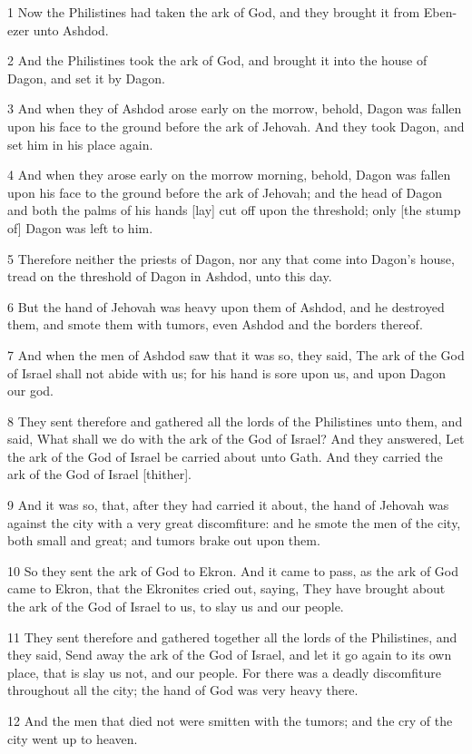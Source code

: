 \par 1 Now the Philistines had taken the ark of God, and they brought it from Eben-ezer unto Ashdod.
\par 2 And the Philistines took the ark of God, and brought it into the house of Dagon, and set it by Dagon.
\par 3 And when they of Ashdod arose early on the morrow, behold, Dagon was fallen upon his face to the ground before the ark of Jehovah. And they took Dagon, and set him in his place again.
\par 4 And when they arose early on the morrow morning, behold, Dagon was fallen upon his face to the ground before the ark of Jehovah; and the head of Dagon and both the palms of his hands [lay] cut off upon the threshold; only [the stump of] Dagon was left to him.
\par 5 Therefore neither the priests of Dagon, nor any that come into Dagon's house, tread on the threshold of Dagon in Ashdod, unto this day.
\par 6 But the hand of Jehovah was heavy upon them of Ashdod, and he destroyed them, and smote them with tumors, even Ashdod and the borders thereof.
\par 7 And when the men of Ashdod saw that it was so, they said, The ark of the God of Israel shall not abide with us; for his hand is sore upon us, and upon Dagon our god.
\par 8 They sent therefore and gathered all the lords of the Philistines unto them, and said, What shall we do with the ark of the God of Israel? And they answered, Let the ark of the God of Israel be carried about unto Gath. And they carried the ark of the God of Israel [thither].
\par 9 And it was so, that, after they had carried it about, the hand of Jehovah was against the city with a very great discomfiture: and he smote the men of the city, both small and great; and tumors brake out upon them.
\par 10 So they sent the ark of God to Ekron. And it came to pass, as the ark of God came to Ekron, that the Ekronites cried out, saying, They have brought about the ark of the God of Israel to us, to slay us and our people.
\par 11 They sent therefore and gathered together all the lords of the Philistines, and they said, Send away the ark of the God of Israel, and let it go again to its own place, that is slay us not, and our people. For there was a deadly discomfiture throughout all the city; the hand of God was very heavy there.
\par 12 And the men that died not were smitten with the tumors; and the cry of the city went up to heaven.

